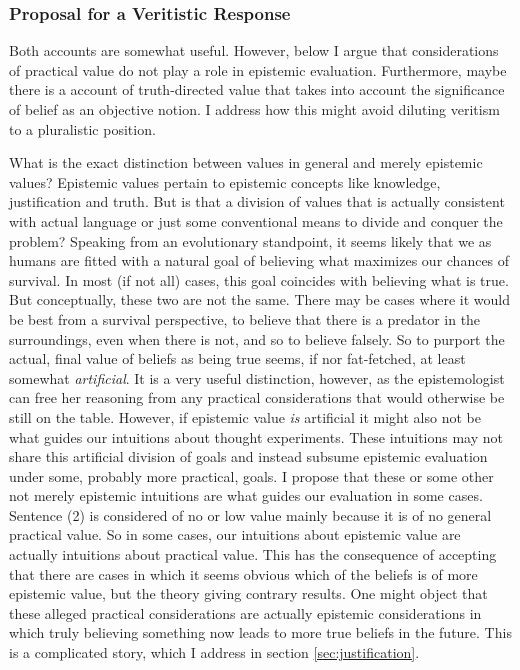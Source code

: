 \documentclass[12pt,numbers=noenddot]{scrartcl}
\begin{document}
\subsubsection{Proposal for a Veritistic Response}
Both accounts are somewhat useful. However, below I argue that considerations of practical value do not play a role in epistemic evaluation. Furthermore, maybe there is a account of truth-directed value that takes into account the significance of belief as an objective notion. I address how this might avoid diluting veritism to a pluralistic position.

What is the exact distinction between values in general and merely epistemic values? Epistemic values pertain to epistemic concepts like knowledge, justification and truth. But is that a division of values that is actually consistent with actual language or just some conventional means to divide and conquer the problem? Speaking from an evolutionary standpoint, it seems likely that we as humans are fitted with a natural goal of believing what maximizes our chances of survival. In most (if not all) cases, this goal coincides with believing what is true. But conceptually, these two are not the same. There may be cases where it would be best from a survival perspective, to believe that there is a predator in the surroundings, even when there is not, and so to believe falsely. So to purport the actual, final value of beliefs as being true seems, if nor fat-fetched, at least somewhat \emph{artificial}. It is a very useful distinction, however, as the epistemologist can free her reasoning from any practical considerations that would otherwise be still on the table. However, if epistemic value \emph{is} artificial it might also not be what guides our intuitions about thought experiments. These intuitions may not share this artificial division of goals and instead subsume epistemic evaluation under some, probably more practical, goals. I propose that these or some other not merely epistemic intuitions are what guides our evaluation in some cases. Sentence (2) is considered of no or low value mainly because it is of no general practical value. So in some cases, our intuitions about epistemic value are actually intuitions about practical value. This has the consequence of accepting that there are cases in which it seems obvious which of the beliefs is of more epistemic value, but the theory giving contrary results. One might object that these alleged practical considerations are actually epistemic considerations in which truly believing something now leads to more true beliefs in the future. This is a complicated story, which I address in section \ref{sec:justification}.
\end{document}
